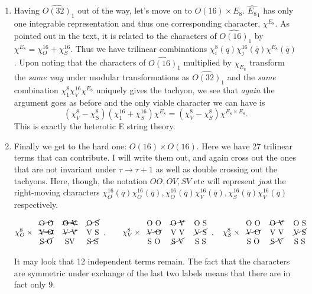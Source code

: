 \documentclass[11pt, class=article, crop=false]{standalone}
\begin{document}
\begin{enumerate}
\begin{enumerate}
	Modular invariance under $\tau \to -1/\tau$ further constrains this to take a form proportional to
	\[
		(\chi^8_V - \chi^8_S)(\chi^{32}_1 + \chi^{32}_S)
	\]
	The normalization of the identity to 1 fixes this entirely. Note that we get spin statistics for \emph{free}, as the only character combinations appearing with a minus sign are precisely those containing $\chi^8_S$, associated with the spacetime fermions. 
	\item Having $\widehat{O(32)}_1$ out of the way, let's move on to $O(16) \times E_8$. $\widehat{E_8}_1$ has only one integrable representation and thus one corresponding character, $\chi^{E_8}$. As pointed out in the text, it is related to the characters of $\widehat{O(16)}_1$ by $\chi^{E_8} = \chi_O^{16} + \chi_S^{16}$. Thus we have trilinear combinations $\chi_i^{8}(q) \chi_j^{16}(\bar q) \chi^{E_8} (\bar q)$. Upon noting that the characters of $\widehat{O(16)}_1$ multiplied by $\chi_{E_8}$ transform the \emph{same way} under modular transformations as $\widehat{O(32)}_1$ and the \emph{same} combination $\chi^8_1 \chi^{16}_V \chi^{E_8}$ uniquely gives the tachyon, we see that \emph{again} the argument goes as before and the only viable character we can have is
	\[
		(\chi^8_V - \chi^8_S)(\chi^{16}_1 + \chi^{16}_S) \chi^{E_8} = (\chi^8_V - \chi^8_S) \chi^{E_8 \times E_8}.
	\]
	This is exactly the heterotic E string theory. 
	\item Finally we get to the hard one: $O(16) \times O(16)$. Here we have 27 trilinear terms that can contribute. I will write them out, and again cross out the ones that are not invariant under $\tau \to \tau+1$ as well as double crossing out the tachyons. Here, though, the notation $OO, OV, SV$ etc will represent \emph{just} the right-moving characters $\chi_O^{16}(\bar q) \chi_O^{16} (\bar q), \chi_O^{16}(\bar q) \chi_V^{16} (\bar q), \chi_S^{16}(\bar q) \chi_V^{16} (\bar q)$ respectively. 
	\begin{center}
	\[
		\chi^{8}_O \times 		\begin{tabular}{c c c}
			\cancel{O O} & \xcancel{O V} & \cancel{O S}\\
			\xcancel{V O} & \cancel{V V} & V S\\
			\cancel{S O} & SV & \cancel{S S}
		\end{tabular},
		\qquad \chi^{8}_V \times 		\begin{tabular}{c c c}
			O O & \cancel{O V} & O S\\
			\cancel{V O} & V V & \cancel{V S}\\
			S O & \cancel{S V} & S S
		\end{tabular},
		\quad \chi^{8}_S \times 		\begin{tabular}{c c c}
			O O & \cancel{O V} & O S\\
			\cancel{V O} & V V & \cancel{V S}\\
			S O & \cancel{S V} & S S
		\end{tabular}
	\]
	\end{center}
	It may look that 12 independent terms remain. The fact that the characters are symmetric under exchange of the last two labels means that there are in fact only 9.
	

\end{enumerate}
\end{enumerate}
\end{document}
